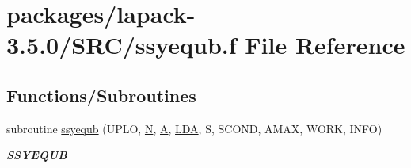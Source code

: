 \hypertarget{ssyequb_8f}{}\section{packages/lapack-\/3.5.0/\+S\+R\+C/ssyequb.f File Reference}
\label{ssyequb_8f}
\subsection*{Functions/\+Subroutines}
\begin{DoxyCompactItemize}
\item 
subroutine \hyperlink{group__realSYcomputational_ga1ab0d003e6854b5c84dc588a978a9e1f}{ssyequb} (U\+P\+L\+O, \hyperlink{polmisc_8c_a0240ac851181b84ac374872dc5434ee4}{N}, \hyperlink{classA}{A}, \hyperlink{example__user_8c_ae946da542ce0db94dced19b2ecefd1aa}{L\+D\+A}, S, S\+C\+O\+N\+D, A\+M\+A\+X, W\+O\+R\+K, I\+N\+F\+O)
\begin{DoxyCompactList}\small\item\em {\bfseries S\+S\+Y\+E\+Q\+U\+B} \end{DoxyCompactList}\end{DoxyCompactItemize}
